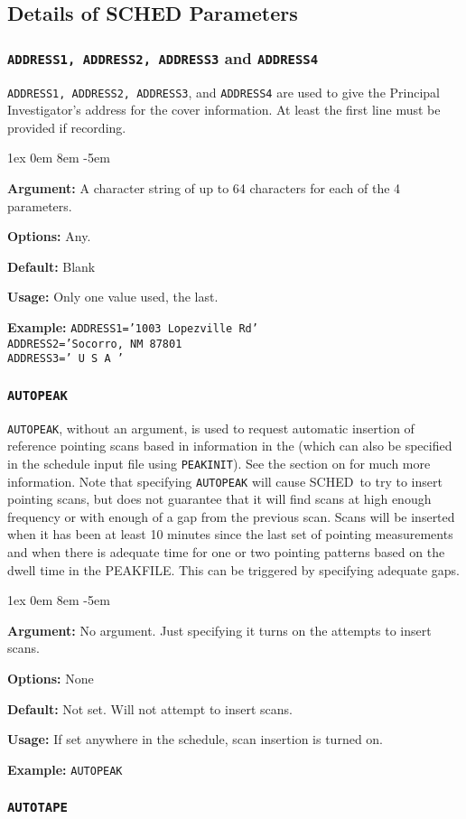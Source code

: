 \documentclass{report}
\newcommand{\schedb}{{\sc SCHED~}}
\newcommand{\rcwbox}[5]{
  \begin{list}{}{\parsep 1ex  \itemsep 0em
                 \leftmargin 8em  \itemindent -5em }
    \item {\bf Argument:} #1
    \item {\bf Options:}  #2
    \item {\bf Default:}  #3
    \item {\bf Usage:}    #4
    \item {\bf Example:}  #5
  \end{list}
}
\begin{document}
\subsection{\label{SSEC:PARDET}Details of SCHED Parameters}


\subsubsection{\label{MP:ADDRESS1}
{\tt ADDRESS1, ADDRESS2, ADDRESS3} and {\tt ADDRESS4}}

{\tt ADDRESS1, ADDRESS2, ADDRESS3}, and {\tt ADDRESS4} are used to
give the Principal Investigator's address for the cover information.
At least the first line must be provided if recording.

\rcwbox
{A character string of up to 64 characters for each of the 4
parameters.}
{Any.}
{Blank}
{Only one value used, the last.}
{{\tt ADDRESS1='1003 Lopezville Rd'}\\
{\tt ADDRESS2='Socorro, NM 87801}\\
{\tt ADDRESS3='  U S A '}}

\subsubsection{\label{MP:AUTOPEAK}{\tt AUTOPEAK}}

{\tt AUTOPEAK}, without an argument, is used to request automatic
insertion of reference pointing scans based in information in
the  (which can also be specified
in the schedule input file using {\tt PEAKINIT}).  See the
section on  for much
more information.  Note that specifying {\tt AUTOPEAK} will cause
\schedb to try to insert pointing scans, but does not guarantee
that it will find scans at high enough frequency or with enough
of a gap from the previous scan.  Scans will be inserted when it has
been at least 10 minutes since the last set of pointing measurements
and when there is adequate time for one or two pointing patterns
based on the dwell time in the PEAKFILE.  This can be triggered by
specifying adequate gaps.

\rcwbox
{No argument.  Just specifying it turns on the attempts to insert
scans.}
{None}
{Not set.  Will not attempt to insert scans.}
{If set anywhere in the schedule, scan insertion is turned on.}
{\tt AUTOPEAK}


\subsubsection{\label{MP:AUTOTAPE}{\tt AUTOTAPE}}
\end{document}
